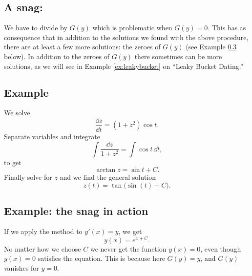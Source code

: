 \subsection{A snag: }\label{sec:snag} We have to divide by $G(y)$ which is %
problematic when $G(y)=0$. This has as consequence that in addition to the solutions
we found with the above procedure, there are at least a few more solutions: the
zeroes of $G(y)$ (see Example \ref{ex:snag} below). In addition to the zeroes of
$G(y)$ there sometimes can be more solutions, as we will see in Example
\ref{ex:leakybucket} on ``Leaky Bucket Dating.''

\subsection{Example} %
We solve
\[
\frac{\dd z}{\dd t} = (1+z^2)\cos t.
\]
Separate variables and integrate
\[
\int\frac{\dd z}{1+z^2} = \int\cos t\,\dd t,
\]
to get
\[
\arctan z = \sin t +C.
\]
Finally solve for $z$ and we find the general solution
\[
z(t) = \tan \bigl (\sin (t) +C\bigr).
\]

\subsection{Example: the snag in action}\label{ex:snag} %
If we apply the method to $y'(x)=y$, we get
\[
y(x) = e^{x+C}.
\]
No matter how we choose $C$ we never get the function $y(x)=0$, even though $y(x)=0$
satisfies the equation.  This is because here $G(y)= y$, and $G(y)$ vanishes for
$y=0$.

